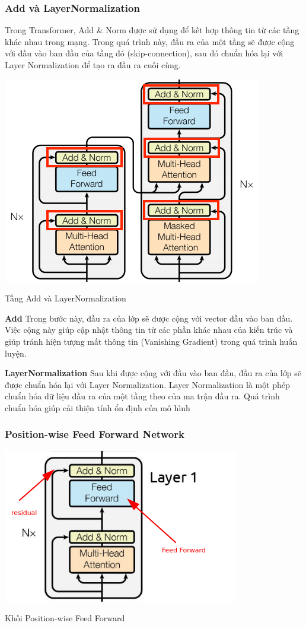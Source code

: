 \documentclass[a4paper, 12pt, openany]{book}
\begin{document}
\subsubsection{Add và LayerNormalization}
Trong Transformer, Add \& Norm được sử dụng để kết hợp thông tin
từ các tầng khác nhau trong mạng. Trong quá trình này, đầu ra của một tầng sẽ được
cộng với đầu vào ban đầu của tầng đó (skip-connection), sau đó chuẩn hóa lại với Layer
Normalization để tạo ra đầu ra cuối cùng.

\begin{minipage}{\linewidth}
    \captionsetup{type=figure}
    \centering
    \includegraphics[width=.8\linewidth]{./assets/images/Add+Norm.png}
    \caption{Tầng Add và LayerNormalization\cite{vaswani2023attention}}
\end{minipage}
\textbf{Add}
Trong bước này, đầu ra của lớp sẽ được cộng với vector
đầu vào ban đầu. Việc cộng này giúp cập nhật thông tin từ các phần khác nhau của kiến
trúc và giúp tránh hiện tượng mất thông tin (Vanishing Gradient) trong quá trình huấn
luyện.

\textbf{LayerNormalization}
Sau khi được cộng với đầu vào ban đầu, đầu ra của lớp sẽ được chuẩn hóa lại với
Layer Normalization. Layer Normalization là một phép chuẩn hóa dữ liệu đầu ra của
một tầng theo của ma trận đầu ra. Quá
trình chuẩn hóa giúp cải thiện tính ổn định của mô hình

\subsubsection{Position-wise Feed Forward Network}
\begin{minipage}{\linewidth}
    \captionsetup{type=figure}
    \centering
    \includegraphics[width=.6\linewidth]{./assets/images/feed-forward-sublayer-in-transformer.png}
    \caption{Khối Position-wise Feed Forward\cite{vaswani2023attention}}
\end{minipage}
\end{document}
